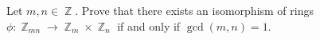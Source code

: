 \documentclass{article}
\DeclareMathOperator{\Z}{\mathbb{Z}}
\begin{document}
Let \(m,n\in\Z\). Prove that there exists an isomorphism of rings \(\phi:\Z_{mn}\to\Z_m\times\Z_n\) if and only if \(\gcd(m,n)=1\).
\end{document}
